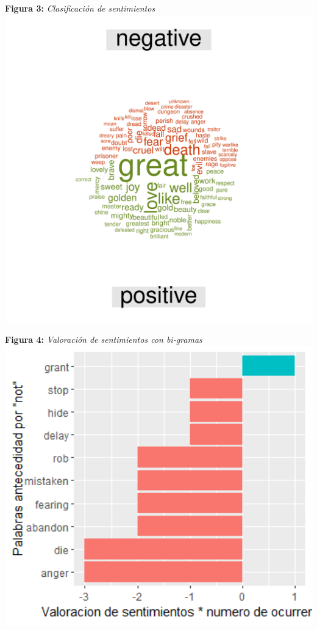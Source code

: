 \documentclass[article,30pt,extrafontsizes]{memoir}
\begin{document}
\begin{multicols*}{3}
{\begin{center}
	\textbf{Figura 3:} \emph{Clasificación de sentimientos}
		\includegraphics[width=9in]{senti_001.png}
\end{center}

\begin{center}
	\textbf{Figura 4:} \emph{Valoración de sentimientos con bi-gramas}
		\includegraphics[width=8in]{Rplot.png}
\end{center}

}
\end{multicols*}
\end{document}
